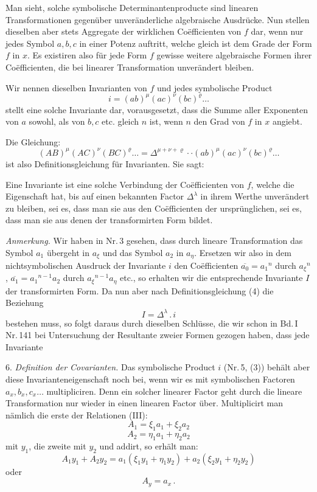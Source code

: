 \documentclass[11pt]{article}
\providecommand{\gesperrt}[1]{\textls[130]{#1}}
\providecommand{\weberpage}[1]{}
\providecommand{\weq}[2]{\begin{equation}\tag{#1}#2\end{equation}}
\let\Delta\varDelta
\begin{document}
Man sieht, solche symbolische Determinantenproducte sind linearen
Transformationen gegenüber unveränderliche algebraische Ausdrücke.
Nun stellen dieselben aber stets Aggregate der wirklichen
Co\"efficienten von $f$ dar, wenn nur jedes Symbol $a, b, c$ in
einer Potenz auftritt, welche gleich ist dem Grade der Form $f$
in $x$. Es existiren also für jede Form $f$ gewisse weitere
algebraische Formen ihrer Co\"efficienten, die bei linearer
Transformation unverändert bleiben.

Wir nennen dieselben \glqq Invarianten\grqq{} von $f$ und jedes symbolische
Product
\weq{3}{i = (ab)^\mu(ac)^\nu(bc)^\varrho\ldots}
stellt eine solche Invariante dar, vorausgesetzt, dass die Summe
aller Exponenten von $a$ sowohl, als von $b, c$ etc. gleich $n$
ist, wenn $n$ den Grad von $f$ in $x$ angiebt.


\weberpage{6}
Die Gleichung:
\weq{4}{(AB)^\mu(AC)^\nu(BC)^\varrho\ldots = \Delta^{\mu+\nu+\varrho}\cdot\cdot(ab)^\mu(ac)^\nu(bc)^\varrho\ldots}
ist also Definitionsgleichung für Invarianten. Sie sagt:

\glqq Eine Invariante ist eine solche Verbindung der Co\"efficienten von
$f$, welche die Eigenschaft hat, bis auf einen bekannten Factor
$\Delta^\lambda$ in ihrem Werthe unverändert zu bleiben, sei es,
dass man sie aus den Co\"efficienten der ursprünglichen, sei es,
dass man sie aus denen der transformirten Form bildet.\grqq{}

\textit{Anmerkung.} Wir haben in Nr.\,3 gesehen, dass durch lineare
Transformation das Symbol $a_1$ übergeht in $a_\xi$ und das
Symbol $a_2$ in $a_\eta$. Ersetzen wir also in dem
nichtsymbolischen Ausdruck der Invariante $i$ den Co\"efficienten
$\overline{a_0}=a_1{}^n$ durch $a_\xi{}^n$,
$\overline{a_1}=a_1{}^{n-1}a_2$ durch $a_\xi{}^{n-1}a_\eta$ etc.,
so erhalten wir die entsprechende Invariante $I$ der
transformirten Form. Da nun aber nach Definitionsgleichung (4)
die Beziehung
\[
I = \Delta^\lambda\,.\,i
\]
bestehen muss, so folgt daraus durch dieselben Schlüsse, die wir
schon in Bd.\,I Nr.\,141 bei Untersuchung der Resultante zweier
Formen gezogen haben, dass jede Invariante \gesperrt{homogen und isobar
vom Gewichte $\lambda$ ist.}

6. \textit{Definition der Covarianten.} Das symbolische Product $i$
(Nr.\,5, (3)) behält aber diese Invarianteneigenschaft noch bei,
wenn wir es mit symbolischen Factoren $a_x, b_x, c_x\ldots$
multipliciren. Denn ein solcher linearer Factor geht durch die
lineare Transformation nur wieder in einen linearen Factor über.
Multiplicirt man nämlich die erste der Relationen (III):
\[
A_1 = \xi_1 a_1 + \xi_2 a_2
\]
\[
A_2 = \eta_1 a_1 + \eta_2 a_2
\]
mit $y_1$, die zweite mit $y_2$ und addirt, so erhält man:
\[
A_1y_1 + A_2y_2 = a_1(\xi_1y_1+\eta_1y_2) + a_2(\xi_2y_1+\eta_2y_2)
\]
oder
\[
A_y = a_x\,.
\]
\end{document}
